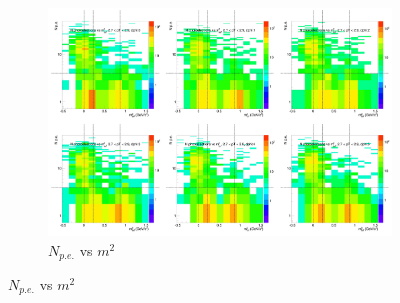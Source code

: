 \begin{figure}[H]
  \centering
    \begin{subfigure}{1\textwidth}
    \includegraphics[width=1\textwidth]{hiptfits/pos/PSaccthreshold_cent0_ich1_accfire0_ptbin11.jpg}
    \caption{$N_{p.e.}$ vs $m^2$}
    \end{subfigure}
\end{figure}
